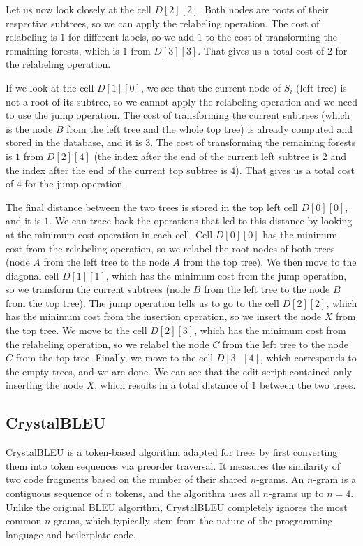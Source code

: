 Let us now look closely at the cell $D[2][2]$.
Both nodes are roots of their respective subtrees, so we can apply the relabeling operation.
The cost of relabeling is $1$ for different labels, so we add $1$ to the cost of transforming the remaining forests, which is $1$ from $D[3][3]$.
That gives us a total cost of $2$ for the relabeling operation.

If we look at the cell $D[1][0]$, we see that the current node of $S_i$ (left tree) is not a root of its subtree, so we cannot apply the relabeling operation and we need to use the jump operation.
The cost of transforming the current subtrees (which is the node $B$ from the left tree and the whole top tree) is already computed and stored in the database, and it is $3$.
The cost of transforming the remaining forests is $1$ from $D[2][4]$ (the index after the end of the current left subtree is $2$ and the index after the end of the current top subtree is $4$).
That gives us a total cost of $4$ for the jump operation.

The final distance between the two trees is stored in the top left cell $D[0][0]$, and it is $1$.
We can trace back the operations that led to this distance by looking at the minimum cost operation in each cell.
Cell $D[0][0]$ has the minimum cost from the relabeling operation, so we relabel the root nodes of both trees (node $A$ from the left tree to the node $A$ from the top tree).
We then move to the diagonal cell $D[1][1]$, which has the minimum cost from the jump operation, so we transform the current subtrees (node $B$ from the left tree to the node $B$ from the top tree).
The jump operation tells us to go to the cell $D[2][2]$, which has the minimum cost from the insertion operation, so we insert the node $X$ from the top tree.
We move to the cell $D[2][3]$, which has the minimum cost from the relabeling operation, so we relabel the node $C$ from the left tree to the node $C$ from the top tree.
Finally, we move to the cell $D[3][4]$, which corresponds to the empty trees, and we are done.
We can see that the edit script contained only inserting the node $X$, which results in a total distance of $1$ between the two trees.

\subsection{CrystalBLEU}\label{sec:crystalbleu}

CrystalBLEU \cite{crystalbleu23} is a token-based algorithm adapted for trees by first converting them into token sequences via preorder traversal.
It measures the similarity of two code fragments based on the number of their shared $n$-grams.
An $n$-gram is a contiguous sequence of $n$ tokens, and the algorithm uses all $n$-grams up to $n=4$.
Unlike the original BLEU algorithm, CrystalBLEU completely ignores the most common $n$-grams, which typically stem from the nature of the programming language and boilerplate code.

